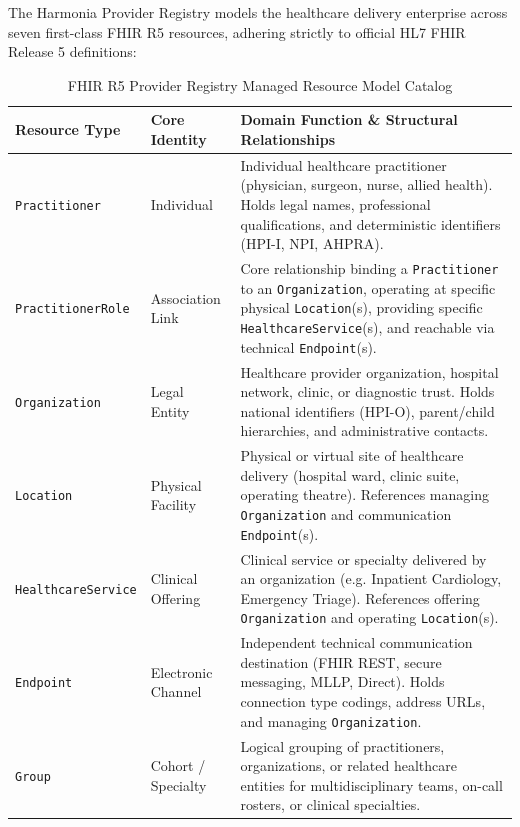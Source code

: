 The Harmonia Provider Registry models the healthcare delivery enterprise across seven first-class FHIR R5 resources, adhering strictly to official HL7 FHIR Release 5 definitions:

\begin{table}[htbp]
\centering
\small
\begin{tabularx}{\textwidth}{l p{3.2cm} X}
\toprule
\textbf{Resource Type} & \textbf{Core Identity} & \textbf{Domain Function \& Structural Relationships} \\
\midrule
\texttt{Practitioner} & Individual & Individual healthcare practitioner (physician, surgeon, nurse, allied health). Holds legal names, professional qualifications, and deterministic identifiers (HPI-I, NPI, AHPRA). \\
\addlinespace
\texttt{PractitionerRole} & Association Link & Core relationship binding a \texttt{Practitioner} to an \texttt{Organization}, operating at specific physical \texttt{Location}(s), providing specific \texttt{HealthcareService}(s), and reachable via technical \texttt{Endpoint}(s). \\
\addlinespace
\texttt{Organization} & Legal Entity & Healthcare provider organization, hospital network, clinic, or diagnostic trust. Holds national identifiers (HPI-O), parent/child hierarchies, and administrative contacts. \\
\addlinespace
\texttt{Location} & Physical Facility & Physical or virtual site of healthcare delivery (hospital ward, clinic suite, operating theatre). References managing \texttt{Organization} and communication \texttt{Endpoint}(s). \\
\addlinespace
\texttt{HealthcareService} & Clinical Offering & Clinical service or specialty delivered by an organization (e.g. Inpatient Cardiology, Emergency Triage). References offering \texttt{Organization} and operating \texttt{Location}(s). \\
\addlinespace
\texttt{Endpoint} & Electronic Channel & Independent technical communication destination (FHIR REST, secure messaging, MLLP, Direct). Holds connection type codings, address URLs, and managing \texttt{Organization}. \\
\addlinespace
\texttt{Group} & Cohort / Specialty & Logical grouping of practitioners, organizations, or related healthcare entities for multidisciplinary teams, on-call rosters, or clinical specialties. \\
\bottomrule
\end{tabularx}
\caption{FHIR R5 Provider Registry Managed Resource Model Catalog}
\label{tab:pr_resource_catalog}
\end{table}

